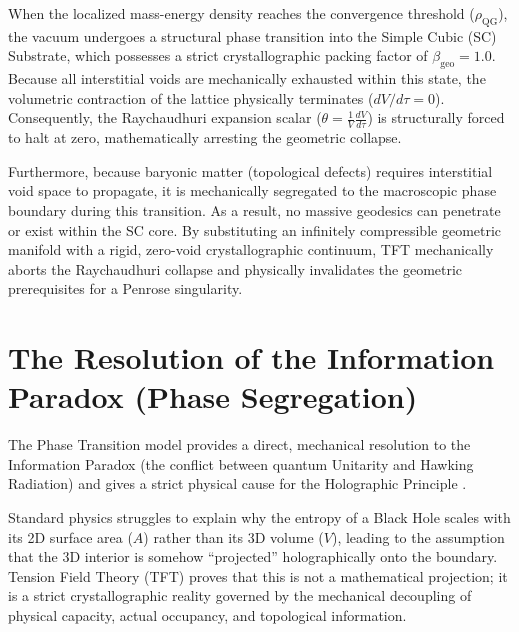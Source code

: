 When the localized mass-energy density reaches the convergence threshold ($\rho_{\mathrm{QG}}$), the vacuum undergoes a structural phase transition into the Simple Cubic (SC) Substrate, which possesses a strict crystallographic packing factor of $\beta_{\mathrm{geo}} = 1.0$. Because all interstitial voids are mechanically exhausted within this state, the volumetric contraction of the lattice physically terminates ($dV/d\tau = 0$). Consequently, the Raychaudhuri expansion scalar ($\theta = \frac{1}{V} \frac{dV}{d\tau}$) is structurally forced to halt at zero, mathematically arresting the geometric collapse.

Furthermore, because baryonic matter (topological defects) requires interstitial void space to propagate, it is mechanically segregated to the macroscopic phase boundary during this transition. As a result, no massive geodesics can penetrate or exist within the SC core. By substituting an infinitely compressible geometric manifold with a rigid, zero-void crystallographic continuum, TFT mechanically aborts the Raychaudhuri collapse and physically invalidates the geometric prerequisites for a Penrose singularity.

\section{The Resolution of the Information Paradox (Phase Segregation)}
\label{sec:information_paradox}
The Phase Transition model provides a direct, mechanical resolution to the Information Paradox (the conflict between quantum Unitarity and Hawking Radiation) and gives a strict physical cause for the Holographic Principle \cite{Susskind_1995}.

Standard physics struggles to explain why the entropy of a Black Hole scales with its 2D surface area ($A$) rather than its 3D volume ($V$), leading to the assumption that the 3D interior is somehow ``projected'' holographically onto the boundary. Tension Field Theory (TFT) proves that this is not a mathematical projection; it is a strict crystallographic reality governed by the mechanical decoupling of physical capacity, actual occupancy, and topological information.

